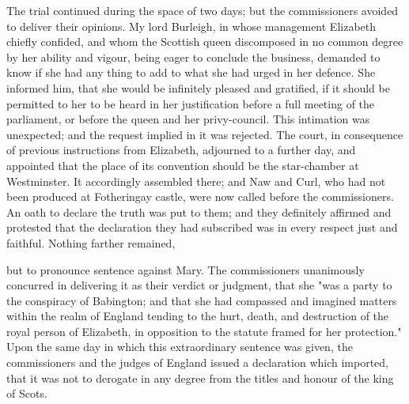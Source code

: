 \documentclass{article}
\begin{document}
The trial continued during the space of two days; but the commissioners avoided to deliver their opinions. My lord Burleigh, in whose management Elizabeth chiefly confided, and whom the Scottish queen discomposed in no common degree by her ability and vigour, being eager to conclude the business, demanded to know if she had any thing to add to what she had urged in her defence. She informed him, that she would be infinitely pleased and gratified, if it should be permitted to her to be heard in her justification before a full meeting of the parliament, or before the queen and her privy-council. This intimation was unexpected; and the request implied in it was rejected. The court, in consequence of previous instructions from Elizabeth, adjourned to a further day, and appointed that the place of its convention should be the star-chamber at Westminster. It accordingly assembled there; and Naw and Curl, who had not been produced at Fotheringay castle, were now called before the commissioners. An oath to declare the truth was put to them; and they definitely affirmed and protested that the declaration they had subscribed was in every respect just and faithful. Nothing farther remained,

but to pronounce sentence against Mary. The commissioners unanimously concurred in delivering it as their verdict or judgment, that she "was a party to the conspiracy of Babington; and that she had compassed and imagined matters within the realm of England tending to the hurt, death, and destruction of the royal person of Elizabeth, in opposition to the statute framed for her protection." Upon the same day in which this extraordinary sentence was given, the commissioners and the judges of England issued a declaration which imported, that it was not to derogate in any degree from the titles and honour of the king of Scots.
\end{document}
